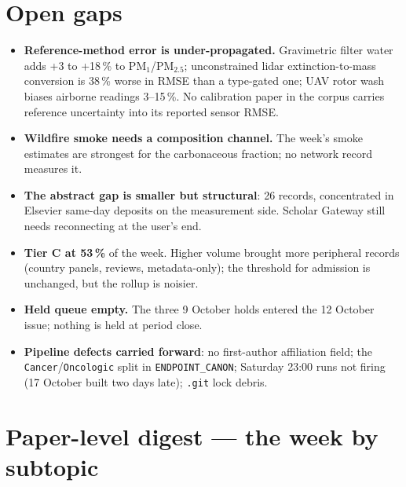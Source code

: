 \documentclass[10pt]{article}
\begin{document}
\vspace{2mm}
\section*{\sffamily\bfseries\color{Deep}Open gaps}
\vspace{-1.5mm}{\color{Teal}\rule{\linewidth}{1.1pt}}\vspace{2.5mm}

\footnotesize
\begin{itemize}
\item \textbf{Reference-method error is under-propagated.} Gravimetric filter water adds +3 to +18\,\%
to PM$_1$/PM$_{2.5}$; unconstrained lidar extinction-to-mass conversion is 38\,\% worse in RMSE than a
type-gated one; UAV rotor wash biases airborne readings 3--15\,\%. No calibration paper in the corpus
carries reference uncertainty into its reported sensor RMSE.

\item \textbf{Wildfire smoke needs a composition channel.} The week's smoke estimates are strongest for the
carbonaceous fraction; no network record measures it.

\item \textbf{The abstract gap is smaller but structural}: 26 records, concentrated in Elsevier same-day
deposits on the measurement side. Scholar Gateway still needs reconnecting at the user's end.

\item \textbf{Tier C at 53\,\%} of the week. Higher volume brought more peripheral records (country
panels, reviews, metadata-only); the threshold for admission is unchanged, but the rollup is noisier.

\item \textbf{Held queue empty.} The three 9 October holds entered the 12 October issue; nothing is held
at period close.

\item \textbf{Pipeline defects carried forward}: no first-author affiliation field; the
\texttt{Cancer}/\texttt{Oncologic} split in \texttt{ENDPOINT\_CANON}; Saturday 23:00 runs not firing
(17 October built two days late); \texttt{.git} lock debris.
\end{itemize}

\clearpage

\section*{\sffamily\bfseries\color{Deep}Paper-level digest --- the week by subtopic}
\vspace{-1.5mm}{\color{Teal}\rule{\linewidth}{1.1pt}}\vspace{1mm}
\end{document}
